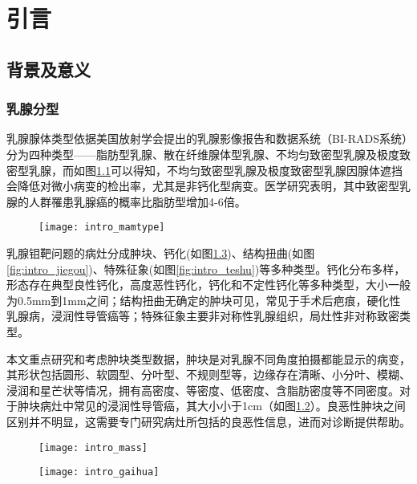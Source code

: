 \chapter{引言}\label{chap:introduction}

\section{背景及意义}	
\subsection{乳腺分型}
乳腺腺体类型依据美国放射学会提出的乳腺影像报告和数据系统（BI-RADS系统）分为四种类型——脂肪型乳腺、散在纤维腺体型乳腺、不均匀致密型乳腺及极度致密型乳腺，而如图\ref{fig:intro_mamtype}可以得知，不均匀致密型乳腺及极度致密型乳腺因腺体遮挡会降低对微小病变的检出率，尤其是非钙化型病变。医学研究表明，其中致密型乳腺的人群罹患乳腺癌的概率比脂肪型增加4-6倍\cite{胡从依2015数字化乳腺}。
\begin{figure}[!htbp]
    \centering
    \texttt{[image: intro\_mamtype]}
    \label{fig:intro_mamtype}
\end{figure}

乳腺钼靶问题的病灶分成肿块、钙化(如图\ref{fig:intro_calc})、结构扭曲(如图\ref{fig:intro_jiegou})、特殊征象(如图\ref{fig:intro_teshu})等多种类型。钙化分布多样，形态存在典型良性钙化，高度恶性钙化，钙化和不定性钙化等多种类型，大小一般为0.5mm到1mm之间；结构扭曲无确定的肿块可见，常见于手术后疤痕，硬化性乳腺病，浸润性导管癌等；特殊征象主要非对称性乳腺组织，局灶性非对称致密类型\cite{杨秋红2005乳腺癌的影像学诊断及进展}。

本文重点研究和考虑肿块类型数据，肿块是对乳腺不同角度拍摄都能显示的病变，其形状包括圆形、软圆型、分叶型、不规则型等，边缘存在清晰、小分叶、模糊、浸润和星芒状等情况，拥有高密度、等密度、低密度、含脂肪密度等不同密度。对于肿块病灶中常见的浸润性导管癌，其大小小于1cm（如图\ref{fig:intro_mass}）\cite{31鲍润贤2002中华影像医学乳腺卷}。良恶性肿块之间区别并不明显，这需要专门研究病灶所包括的良恶性信息，进而对诊断提供帮助。
\begin{figure}[!htbp]
    \centering
    \texttt{[image: intro\_mass]}
    \label{fig:intro_mass}
\end{figure}

\begin{figure}[!htbp]
    \centering
    \texttt{[image: intro\_gaihua]}
    \label{fig:intro_calc}
\end{figure}


